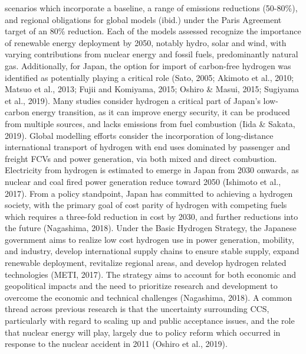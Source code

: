 scenarios which incorporate a baseline, a range of emissions reductions (50-80\%), and regional obligations for global models (ibid.) under the Paris Agreement target of an 80\% reduction. Each of the models assessed recognize the importance of renewable energy deployment by 2050, notably hydro, solar and wind, with varying contributions from nuclear energy and fossil fuels, predominantly natural gas. Additionally, for Japan, the option for import of carbon-free hydrogen was identified as potentially playing a critical role (Sato, 2005; Akimoto et al., 2010; Matsuo et al., 2013; Fujii and Komiyama, 2015; Oshiro \& Masui, 2015; Sugiyama et al., 2019). Many studies consider hydrogen a critical part of Japan's low-carbon energy transition, as it can improve energy security, it can be produced from multiple sources, and lacks emissions from fuel combustion (Iida \& Sakata, 2019). Global modelling efforts consider the incorporation of long-distance international transport of hydrogen with end uses dominated by passenger and freight \gls{FCV}s and power generation, via both mixed and direct combustion. Electricity from hydrogen is estimated to emerge in Japan from 2030 onwards, as nuclear and coal fired power generation reduce toward 2050 (Ishimoto et al., 2017). From a policy standpoint, Japan has committed to achieving a hydrogen society, with the primary goal of cost parity of hydrogen with competing fuels which requires a three-fold reduction in cost by 2030, and further reductions into the future (Nagashima, 2018). Under the Basic Hydrogen Strategy, the Japanese government aims to realize low cost hydrogen use in power generation, mobility, and industry, develop international supply chains to ensure stable supply, expand renewable deployment, revitalize regional areas, and develop hydrogen related technologies (METI, 2017). The strategy aims to account for both economic and geopolitical impacts and the need to prioritize research and development to overcome the economic and technical challenges (Nagashima, 2018). A common thread across previous research is that the uncertainty surrounding \gls{CCS}, particularly with regard to scaling up and public acceptance issues, and the role that nuclear energy will play, largely due to policy reform which occurred in response to the nuclear accident in 2011 (Oshiro et al., 2019).

